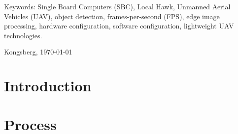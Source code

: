 \documentclass[
oneside    %
]{USN-BSc}
\begin{document}
Keywords: Single Board Computers (SBC), Local Hawk, Unmanned Aerial Vehicles (UAV), object detection, frames-per-second (FPS), edge image processing, hardware configuration, software configuration, lightweight UAV technologies.

Kongsberg, \today


\tableofcontents
{}

\listoffigures %




 

\chapter{Introduction}
\label{ch:intro}


\chapter{Process}
\label{ch:process}

\end{document}
